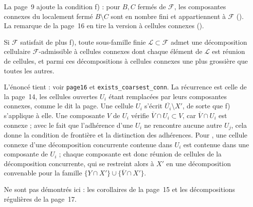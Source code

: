 La page~9 ajoute la condition f) : pour $B, C$ fermés de $\mathcal F$, les composantes connexes du localement fermé $B \setminus C$ sont en nombre fini et appartiennent à $\mathcal F$ (). La remarque de la page~16 en tire la version à cellules connexes ().

\begin{encadre}
\begin{theoreme}
Si $\mathcal F$ satisfait de plus f), toute sous-famille finie $\mathcal L \subset \mathcal F$ admet une décomposition cellulaire $\mathcal F$-admissible à cellules connexes dont chaque élément de $\mathcal L$ est réunion de cellules, et parmi ces décompositions à cellules connexes une plus grossière que toutes les autres.
\end{theoreme}
\end{encadre}

\noindent L'énoncé tient : voir \texttt{page16} et \texttt{exists\_\allowbreak{}coarsest\_conn}. La récurrence est celle de la page~14, les cellules ouvertes $U_i$ étant remplacées par leurs composantes connexes, comme le dit la page. Une cellule $U_i$ s'écrit $\overline{U_i} \setminus X'$, de sorte que f) s'applique à elle. Une composante $V$ de $U_i$ vérifie $\overline V \cap U_i \subset V$, car $\overline V \cap U_i$ est connexe ; avec le fait que l'adhérence d'une $U_i$ ne rencontre aucune autre $U_j$, cela donne la condition de frontière et la distinction des adhérences. Pour , une cellule connexe d'une décomposition concurrente contenue dans $U_i$ est contenue dans une composante de $U_i$ ; chaque composante est donc réunion de cellules de la décomposition concurrente, qui se restreint alors à $X'$ en une décomposition convenable pour la famille $\{Y \cap X'\} \cup \{\overline V \cap X'\}$.

Ne sont pas démontrés ici : les corollaires de la page~15 et les décompositions régulières de la page~17.
